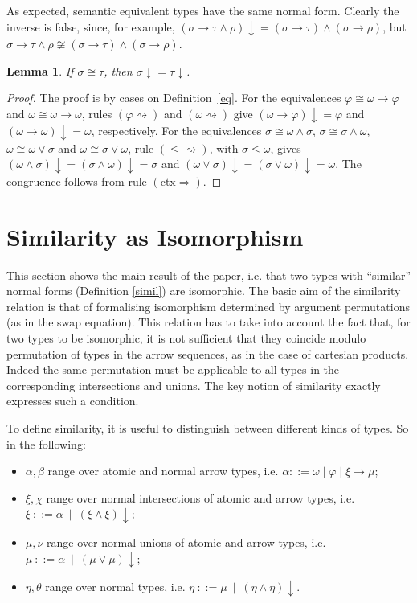 \documentclass[UKenglish]{eptcs}
\newtheorem{lemma}[fact]{Lemma}
\newcommand{\tA}{\sigma}       \newcommand{\tB}{\tau}
\newcommand{\tC}{\rho}
\newcommand{\tM}{\mu}
\newcommand{\tN}{\nu}
\newcommand{\te}{\xi}
\newcommand{\ti}{\chi}
\newcommand{\tu}{\omega}
\newcommand{\tO}{\alpha}
\newcommand{\tP}{\beta}
\newcommand{\tQ}{\eta}
\newcommand{\tY}{\theta}
\newcommand{\tS}{\sigma}       \newcommand{\tT}{\tau}
\newcommand{\labelx}[1]{\label{#1}}
\newcommand{\nf}[1]{#1\!\!\downarrow}
\newcommand{\rr}{\Rightarrow}
\newcommand{\esim}{\cong}
\begin{document}
As expected, semantic equivalent types have the same normal form. Clearly the inverse is false, since, for example, $\nf{(\tA\to\tB\wedge\tC)}=(\tA\to\tB)\wedge(\tA\to\tC)$, but $\tA\to\tB\wedge\tC\not\esim(\tA\to\tB)\wedge(\tA\to\tC)$.

\begin{lemma}\labelx{nc}
If  $\tS\esim \tB$, then $\nf{\tS} = \nf{\tB}$.
\end{lemma}
\begin{proof} The proof is by cases on Definition~\ref{eq}. For the equivalences $\varphi\esim\omega\to\varphi$ and $\omega\esim\omega\to\omega$, rules $(\varphi\rightsquigarrow)$ and $(\omega\rightsquigarrow)$ give $\nf{(\omega\to\varphi)}=\varphi$ and $\nf{(\omega\to\omega)}=\omega$, respectively. For the equivalences $\tS\esim\omega\wedge\tS$, $\tS\esim\tS\wedge\omega$, $\omega\esim\omega\vee\tS$ and $\omega\esim\tS\vee\omega$, rule $(\leq\rightsquigarrow)$, with $\tA\leq\tu$, gives $\nf{(\omega\wedge\tS)}=\nf{(\tS\wedge\omega)}=\tS$ and $\nf{(\omega\vee\tS)}=\nf{(\tS\vee\omega)}=\omega$. The congruence follows from rule $(\text{ctx}\rr)$.
\end{proof}

\section{Similarity as Isomorphism}\labelx{sse}
This section shows the main result of the paper, i.e. that two types with ``similar'' normal forms (Definition \ref{simil}) are isomorphic.
The basic aim of the similarity relation is that of formalising
isomorphism determined by argument permutations (as in the swap
equation). This relation has  to take into
account the fact that, for two types to be isomorphic, it is not
sufficient that they coincide modulo permutation of types in the
arrow sequences, as in the case of cartesian products. Indeed the
same permutation must be applicable to all types
in the corresponding intersections and unions. The key notion of similarity exactly expresses such a condition.

To define similarity, it is useful to distinguish between different kinds of types. So in the following:
\begin{itemize}
\item $\tO, \tP $  range over atomic and normal arrow types, i.e. $\tO ::=\omega\mid \varphi \mid \te \to \tM$;
\item $\te,\ti$ range over normal intersections of atomic and arrow types, i.e. $\te~::=\tO~\mid~\nf{(\te\wedge\te)}$;
\item $\tM,\tN$  range over normal unions of atomic and arrow types, i.e. $\tM~::=\tO~\mid~\nf{(\tM\vee\tM)}$;
\item $\tQ,\tY$ range over normal types, i.e. $\tQ~::=\tM~\mid~\nf{(\tQ\wedge\tQ)}$.
\end{itemize}
\end{document}
